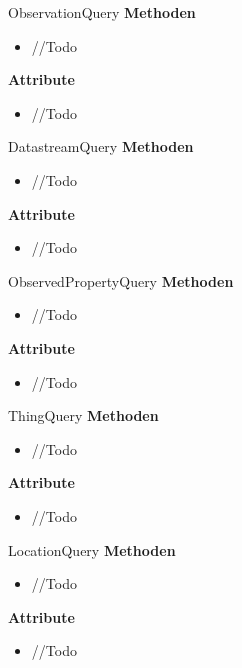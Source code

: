 \begin{Class}{ObservationQuery}
    \textbf{Methoden}
    \begin{itemize}
        \item //Todo
    \end{itemize}
    
    \textbf{Attribute}
    \begin{itemize}
        \item //Todo
    \end{itemize}
\end{Class}

\begin{Class}{DatastreamQuery}
    \textbf{Methoden}
    \begin{itemize}
        \item //Todo
    \end{itemize}
    
    \textbf{Attribute}
    \begin{itemize}
        \item //Todo
    \end{itemize}
\end{Class}

\begin{Class}{ObservedPropertyQuery}
    \textbf{Methoden}
    \begin{itemize}
        \item //Todo
    \end{itemize}
    
    \textbf{Attribute}
    \begin{itemize}
        \item //Todo
    \end{itemize}
\end{Class}

\begin{Class}{ThingQuery}
    \textbf{Methoden}
    \begin{itemize}
        \item //Todo
    \end{itemize}
    
    \textbf{Attribute}
    \begin{itemize}
        \item //Todo
    \end{itemize}
\end{Class}

\begin{Class}{LocationQuery}
    \textbf{Methoden}
    \begin{itemize}
        \item //Todo
    \end{itemize}
    
    \textbf{Attribute}
    \begin{itemize}
        \item //Todo
    \end{itemize}
\end{Class}

